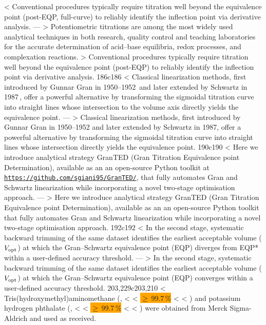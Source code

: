< Conventional procedures typically require titration well beyond the equivalence point (post-EQP, full-curve) to reliably identify the inflection point via derivative analysis.
---
> Potentiometric titrations are among the most widely used analytical techniques in both research, quality control and teaching laboratories for the accurate determination of acid--base equilibria, redox processes, and complexation reactions.
> Conventional procedures typically require titration well beyond the equivalence point (post-EQP) to reliably identify the inflection point via derivative analysis.
186c186
< Classical linearization methods, first introduced by Gunnar Gran in 1950--1952\,\cite{Gran1950,Gran1952} and later extended by Schwartz in 1987\,\cite{Schwartz1987}, offer a powerful alternative by transforming the sigmoidal titration curve into straight lines whose intersection to the volume axis directly yields the equivalence point.
---
> Classical linearization methods, first introduced by Gunnar Gran in 1950--1952 and later extended by Schwartz in 1987, offer a powerful alternative by transforming the sigmoidal titration curve into straight lines whose intersection directly yields the equivalence point.
190c190
< Here we introduce analytical strategy \textsf{GranTED} (Gran Titration Equivalence point Determination), available as an an open-source Python toolkit at \href{https://github.com/sgiani95/GranTED/}{\texttt{https://github.com/sgiani95/GranTED/}}, that fully automates Gran and Schwartz linearization while incorporating a novel two-stage optimisation approach.
---
> Here we introduce analytical strategy \textsf{GranTED} (Gran Titration Equivalence point Determination), available as an an open-source Python toolkit that fully automates Gran and Schwartz linearization while incorporating a novel two-stage optimisation approach.
192c192
< In the second stage, systematic backward trimming of the same dataset identifies the earliest acceptable volume (\(V_{\rm opt}\)) at which the Gran--Schwartz equivalence point (EQP) diverges from EQP* within a user-defined accuracy threshold.
---
> In the second stage, systematic backward trimming of the same dataset identifies the earliest acceptable volume (\(V_{\rm opt}\)) at which the Gran--Schwartz equivalence point (EQP) converges within a user-defined accuracy threshold.
203,229c203,210
< Tris(hydroxymethyl)aminomethane (,
< %
< \colorbox{orange}{$\geq$\,99.7\,\%}
< %
< ) and potassium hydrogen phthalate (,
< %
< \colorbox{orange}{$\geq$\,99.7\,\%}
< %
< ) were obtained from Merck Sigma-Aldrich and used as received.
